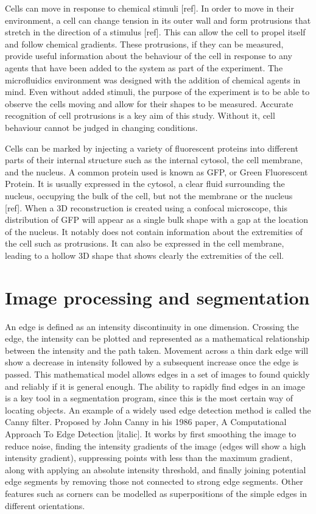 Cells can move in response to chemical stimuli [ref]. In order to move in their environment, a cell can change tension in its outer wall and form protrusions that stretch in the direction of a stimulus [ref]. This can allow the cell to propel itself and follow chemical gradients. These protrusions, if they can be measured, provide useful information about the behaviour of the cell in response to any agents that have been added to the system as part of the experiment. The microfluidics environment was designed with the addition of chemical agents in mind. Even without added stimuli, the purpose of the experiment is to be able to observe the cells moving and allow for their shapes to be measured. Accurate recognition of cell protrusions is a key aim of this study. Without it, cell behaviour cannot be judged in changing conditions.

Cells can be marked by injecting a variety of fluorescent proteins into different parts of their internal structure such as the internal cytosol, the cell membrane, and the nucleus. A common protein used is known as GFP, or Green Fluorescent Protein. It is usually expressed in the cytosol, a clear fluid surrounding the nucleus, occupying the bulk of the cell, but not the membrane or the nucleus [ref]. When a 3D reconstruction is created using a confocal microscope, this distribution of GFP will appear as a single bulk shape with a gap at the location of the nucleus. It notably does not contain information about the extremities of the cell such as protrusions. It can also be expressed in the cell membrane, leading to a hollow 3D shape that shows clearly the extremities of the cell.

\section{Image processing and segmentation}

An edge is defined as an intensity discontinuity in one dimension. Crossing the edge, the intensity can be plotted and represented as a mathematical relationship between the intensity and the path taken. Movement across a thin dark edge will show a decrease in intensity followed by a subsequent increase once the edge is passed. This mathematical model allows edges in a set of images to found quickly and reliably if it is general enough. The ability to rapidly find edges in an image is a key tool in a segmentation program, since this is the most certain way of locating objects. An example of a widely used edge detection method is called the Canny filter. Proposed by John Canny in his 1986 paper, A Computational Approach To Edge Detection [italic]. It works by first smoothing the image to reduce noise, finding the intensity gradients of the image (edges will show a high intensity gradient), suppressing points with less than the maximum gradient, along with applying an absolute intensity threshold, and finally joining potential edge segments by removing those not connected to strong edge segments. Other features such as corners can be modelled as superpositions of the simple edges in different orientations.

